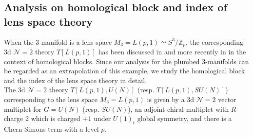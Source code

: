 \documentclass[11pt,hyper,a4paper]{article}
\begin{document}
\subsection{Analysis on homological block and index of lens space theory}

When the 3-manifold is a lens space $M_3 = L(p,1) \simeq S^3/\mathbb{Z}_p$, the corresponding 3d $\mathcal{N}=2$ theory $T[L(p,1)]$ has been discussed in \cite{Gadde-Gukov-Putrov-4manifold, Chung-Dimofte-Gukov-Sulkowski, Gukov-Pei} and more recently in \cite{Gukov-Putrov-Vafa, Gukov-Pei-Putrov-Vafa} in the context of homological blocks.
Since our analysis for the plumbed 3-manifolds can be regarded as an extrapolation of this example, we study the homological block and the index of the lens space theory in detail.	\\


The 3d $\mathcal{N}=2$ theory $T[L(p,1), U(N)]$ (resp. $T[L(p,1), SU(N)]$) corresponding to the lens space $M_3=L(p,1)$ is given by a 3d $\mathcal{N}=2$ vector multiplet for $G=U(N)$ (resp. $SU(N)$), an adjoint chiral multiplet with $R$-charge 2 which is charged $+1$ under $U(1)_t$ global symmetry, and there is a Chern-Simons term with a level $p$.
\end{document}
